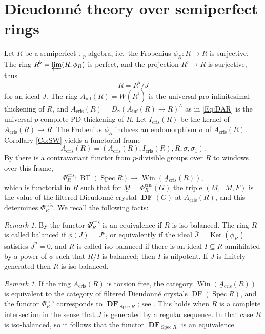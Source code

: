 \documentclass[a4paper,11pt]{article}
\theoremstyle{plain}
\theoremstyle{definition}
\theoremstyle{remark}
\newtheorem{Remark}[Lemma]{Remark}
\theoremstyle{definition}
\numberwithin{Lemma}{section}
\numberwithin{Subpoint}{Lemma}
\numberwithin{equation}{section}
\newcommand{\DD}{{\mathbb{D}}}
\newcommand{\FF}{{\mathbb{F}}}
\DeclareMathOperator{\BT}{BT}
\DeclareMathOperator{\DFcat}{DF}
\DeclareMathOperator{\DFfun}{\mathbf{DF}} %
\DeclareMathOperator{\Filone}{Fil^1}
\DeclareMathOperator{\Ker}{Ker}
\DeclareMathOperator{\Spec}{Spec}
\DeclareMathOperator{\Win}{Win}
\DeclareMathOperator{\cris}{cris}
\renewcommand{\u}{\underline}
\newcommand{\chang}[1]{{#1}}
\begin{document}
\section{Dieudonn\'e theory over semiperfect rings}
\label{Se:semiperfect}

Let $R$ be a semiperfect $\FF_p$-algebra,
i.e.\ the Frobenius $\phi_R:R\to R$ is surjective.
The ring $R^\flat=\varprojlim(R,\phi_R)$ is perfect,
and the projection $R^\flat\to R$ is surjective, thus 
\[
R=R^\flat/J
\]
for an ideal $J$.
The ring $A_{\inf}(R)=W(R^\flat)$ is the universal pro-infinitesimal
thickening of $R$, and $A_{\cris}(R)=D_\gamma(A_{\inf}(R)\to R)^\wedge$
as in \eqref{Eq:DAR} is the universal \chang{$p$-complete} PD thickening of $R$.
Let $I_{\cris}(R)$ be the kernel of $A_{\cris}(R)\to R$.
The Frobenius $\phi_R$ induces an endomorphism $\sigma$ of $A_{\cris}(R)$.
\chang{Corollary \ref{Co:SW} yields} a functorial frame
\begin{equation}
\label{Eq:uAcrisR}
\u A{}_{\cris}(R)=(A_{\cris}(R),I_{\cris}(R),R,\sigma,\sigma_1).
\end{equation}
\chang{By \cite[Th.~6.3]{Lau:Semiperfect} there is a contravariant functor
from $p$-divisible groups over $R$ to windows over this frame,
\begin{equation}
\label{Eq:PhiRcris}
\Phi_R^{\cris}:\BT(\Spec R)\to\Win(\u A{}_{\cris}(R)),
\end{equation}
which is functorial in $R$
such that for $\u M=\Phi_R^{\cris}(G)$ the triple
$(M,\Filone M,F)$ is the value of the filtered Dieudonn\'e crystal $\DFfun(G)$ at $A_{\cris}(R)$, and this determines $\Phi_R^{\cris}$.} 
We recall the following facts:

\begin{Remark}
By \cite[Th.~7.10]{Lau:Semiperfect}
the functor $\Phi_R^{\cris}$ is an equivalence if $R$ is iso-balanced.
The ring $R$ is called balanced if $\phi(J)=J^p$,
or equivalently if the ideal $\bar J=\Ker(\phi_R)$ satisfies $\bar J^p=0$, 
and $R$ is called iso-balanced 
if there is an ideal $I\subseteq R$ 
annihilated by a power of $\phi$ such that $R/I$ is balanced;
then $I$ is nilpotent.
If $J$ is finitely generated then $R$ is iso-balanced.
\end{Remark}


\begin{Remark}
\label{Rk:Acris-DF}
If the ring $A_{\cris}(R)$ is torsion free,
the category $\Win(\u A{}_{\cris}(R))$
is equivalent to the category of filtered Dieudonn\'e crystals 
$\DFcat(\Spec R)$,
and the functor $\Phi_R^{\cris}$ 
corresponds to $\DFfun_{\Spec R}$;
see  \cite[Prop.~2.6.4]{Cais-Lau}.
This holds when $R$ is a complete intersection
in the sense that $J$ is generated by a regular sequence.
In that case $R$ is iso-balanced, so it follows that
the functor $\DFfun_{\Spec R}$ is an equivalence.
\end{Remark}
\end{document}
